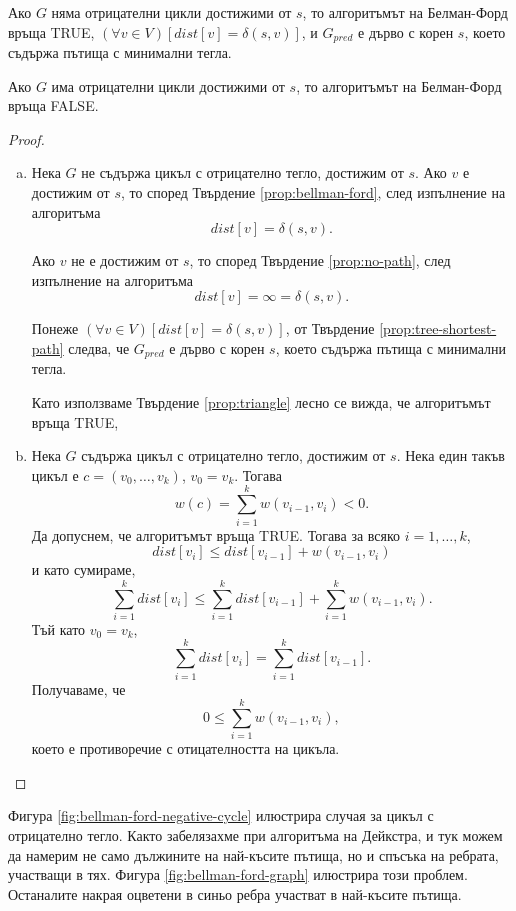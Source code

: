 \begin{thm}
  \label{th:bellman-ford}
  Ако $G$ няма отрицателни цикли достижими от $s$, то
  алгоритъмът на Белман-Форд връща TRUE, $(\forall v\in V)[dist[v] = \delta(s,v)]$,
  и $G_{pred}$ е дърво с корен $s$, което съдържа пътища с минимални тегла.

  Ако $G$ има отрицателни цикли достижими от $s$, то
  алгоритъмът на Белман-Форд връща FALSE.
\end{thm}
\begin{proof}
  \begin{enumerate}[a)]
  \item 
    Нека $G$ не съдържа цикъл с отрицателно тегло, достижим от $s$.
    Ако $v$ е достижим от $s$, то според Твърдение \ref{prop:bellman-ford}, 
    след изпълнение на алгоритъма
    \[dist[v] = \delta(s,v).\]

    Ако $v$ не е достижим от $s$, то според Твърдение \ref{prop:no-path},
    след изпълнение на алгоритъма
    \[dist[v] = \infty = \delta(s,v).\]

    Понеже $(\forall v\in V)[dist[v] = \delta(s,v)]$, от Твърдение \ref{prop:tree-shortest-path} следва, че
    $G_{pred}$ е дърво с корен $s$, което съдържа пътища с минимални тегла.
    
    Като използваме Твърдение \ref{prop:triangle} лесно се вижда, че алгоритъмът връща TRUE, 
  \item
    Нека $G$ съдържа цикъл с отрицателно тегло, достижим от $s$.
    Нека един такъв цикъл е $c = (v_0,\dots,v_k)$, $v_0 = v_k$.
    Тогава
    \[w(c) = \sum^k_{i=1}w(v_{i-1},v_i) < 0.\]
    Да допуснем, че алгоритъмът връща TRUE. Тогава за всяко $i = 1,\dots, k$, 
    \[dist[v_i] \leq dist[v_{i-1}] + w(v_{i-1},v_i)\]
    и като сумираме, 
    \[\sum^{k}_{i=1} dist[v_i] \leq \sum^{k}_{i=1} dist[v_{i-1}] + \sum^{k}_{i=1}w(v_{i-1},v_i).\]
    Тъй като $v_0 = v_k$, 
    \[\sum^{k}_{i=1} dist[v_i] = \sum^{k}_{i=1}dist[v_{i-1}].\]
    Получаваме, че \[0 \leq \sum^{k}_{i=1}w(v_{i-1},v_i),\] което е противоречие с отицателността на цикъла.
  \end{enumerate}
\end{proof}

Фигура \ref{fig:bellman-ford-negative-cycle} илюстрира случая за цикъл с отрицателно тегло.
Както забелязахме при алгоритъма на Дейкстра, и тук можем да намерим не само дължините на най-късите пътища, но
и спъсъка на ребрата, участващи в тях. Фигура \ref{fig:bellman-ford-graph} илюстрира този проблем. 
Останалите накрая оцветени в синьо ребра участват в най-късите пътища.



